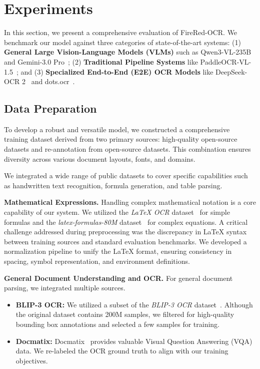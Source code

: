 


\section{Experiments}
\label{sec:experiments}

In this section, we present a comprehensive evaluation of FireRed-OCR. We benchmark our model against three categories of state-of-the-art systems: (1) \textbf{General Large Vision-Language Models (VLMs)} such as Qwen3-VL-235B~\cite{bai2025qwen3} and Gemini-3.0 Pro~\cite{google2025gemini3pro}; (2) \textbf{Traditional Pipeline Systems} like PaddleOCR-VL-1.5~\cite{cui2026paddleocr}; and (3) \textbf{Specialized End-to-End (E2E) OCR Models} like DeepSeek-OCR 2~\cite{wei2026deepseek} and dots.ocr~\cite{li2025dots}.

\subsection{Data Preparation}

To develop a robust and versatile model, we constructed a comprehensive training dataset derived from two primary sources: high-quality open-source datasets and re-annotation from open-source datasets. This combination ensures diversity across various document layouts, fonts, and domains.



We integrated a wide range of public datasets to cover specific capabilities such as handwritten text recognition, formula generation, and table parsing. 



\textbf{Mathematical Expressions.} 
Handling complex mathematical notation is a core capability of our system. We utilized the \textit{LaTeX OCR} dataset~\cite{latex_ocr} for simple formulas and the \textit{latex-formulas-80M} dataset~\cite{latex-formulas-80M} for complex equations.
A critical challenge addressed during preprocessing was the discrepancy in \LaTeX{} syntax between training sources and standard evaluation benchmarks. We developed a normalization pipeline to unify the \LaTeX{} format, ensuring consistency in spacing, symbol representation, and environment definitions. 


\textbf{General Document Understanding and OCR.} 
For general document parsing, we integrated multiple sources.
\begin{itemize}
    \item \textbf{BLIP-3 OCR:} We utilized a subset of the \textit{BLIP-3 OCR} dataset~\cite{xue2024xgen}. Although the original dataset contains 200M samples, we filtered for high-quality bounding box annotations and selected a few samples for training.
    \item \textbf{Docmatix:} Docmatix~\cite{laurencon2024building} provides valuable Visual Question Answering (VQA) data. We re-labeled the OCR ground truth to align with our training objectives. 
\end{itemize}

